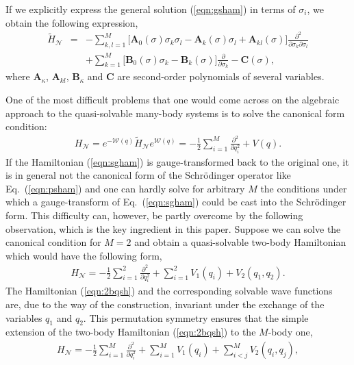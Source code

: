\documentclass[a4paper,preprint,amsfonts,amssymb,amsmath,%
tightenlines,nofootinbib,noshowpacs]{revtex4}
\newcommand{\cN}{\mathcal{N}}
\newcommand{\cW}{\mathcal{W}}
\newcommand{\bA}{\boldsymbol{A}}
\newcommand{\bB}{\boldsymbol{B}}
\newcommand{\bC}{\boldsymbol{C}}
\begin{document}
If we explicitly express the general solution (\ref{eqn:gsham})
in terms of $\sigma_{i}$, we obtain the following expression,
\begin{eqnarray}
\tilde{H}_{\cN}&=&-\sum_{k,l=1}^{M}\bigl[\bA_{0}(\sigma)
\sigma_{k}\sigma_{l}-\bA_{k}(\sigma)\sigma_{l}+\bA_{kl}(\sigma)\bigr]
\frac{\partial^{2}}{\partial\sigma_{k}\partial\sigma_{l}}\nonumber\\
&&+\sum_{k=1}^{M}\bigl[\bB_{0}(\sigma)\sigma_{k}-\bB_{k}(\sigma)\bigr]
\frac{\partial}{\partial\sigma_{k}}-\bC(\sigma),
\label{eqn:sgham}
\end{eqnarray}
where $\bA_{\kappa}$, $\bA_{kl}$, $\bB_{\kappa}$ and $\bC$ are
second-order polynomials of several variables.

One of the most difficult problems that one would come across
on the algebraic approach to the quasi-solvable many-body systems
is to solve the canonical form condition:
\begin{eqnarray}
H_{\cN}=e^{-\cW(q)}\tilde{H}_{\cN}e^{\cW(q)}=-\frac{1}{2}
\sum_{i=1}^{M}\frac{\partial^{2}}{\partial q_{i}^{2}}+V(q).
\label{eqn:cfcon}
\end{eqnarray}
If the Hamiltonian (\ref{eqn:sgham}) is gauge-transformed
back to the original one, it is in general not the canonical
form of the Schr\"odinger operator like Eq.~(\ref{eqn:psham})
and one can hardly solve for arbitrary $M$ the conditions
under which a gauge-transform of Eq.~(\ref{eqn:sgham})
could be cast into the Schr\"odinger form. This difficulty can,
however, be partly overcome by the following observation, which is
the key ingredient in this paper. Suppose we can solve the canonical
condition for $M=2$ and obtain a quasi-solvable two-body
Hamiltonian which would have the following form,
\begin{eqnarray}
H_{\cN}=-\frac{1}{2}\sum_{i=1}^{2}\frac{\partial^{2}}%
{\partial q_{i}^{2}}+\sum_{i=1}^{2}V_{1}(q_{i})+V_{2}(q_{1},q_{2}).
\label{eqn:2bqsh}
\end{eqnarray}
The Hamiltonian (\ref{eqn:2bqsh}) and the corresponding solvable
wave functions are, due to the way of the construction,
invariant under the exchange of the variables $q_{1}$ and $q_{2}$.
This permutation symmetry ensures that the simple extension of the
two-body Hamiltonian (\ref{eqn:2bqsh}) to the $M$-body one,
\begin{eqnarray}
H_{\cN}=-\frac{1}{2}\sum_{i=1}^{M}\frac{\partial^{2}}%
{\partial q_{i}^{2}}+\sum_{i=1}^{M}V_{1}(q_{i})
+\sum_{i<j}^{M}V_{2}(q_{i},q_{j}),
\label{eqn:m2qsh}
\end{eqnarray}
\end{document}
